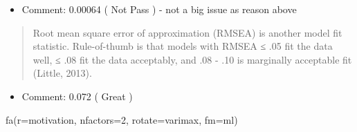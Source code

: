 \documentclass[
]{article}
\newenvironment{Shaded}{\begin{snugshade}}{\end{snugshade}}
\newcommand{\AttributeTok}[1]{\textcolor[rgb]{0.77,0.63,0.00}{#1}}
\newcommand{\DecValTok}[1]{\textcolor[rgb]{0.00,0.00,0.81}{#1}}
\newcommand{\FunctionTok}[1]{\textcolor[rgb]{0.00,0.00,0.00}{#1}}
\newcommand{\NormalTok}[1]{#1}
\newcommand{\StringTok}[1]{\textcolor[rgb]{0.31,0.60,0.02}{#1}}
\providecommand{\tightlist}{%
  \setlength{\itemsep}{0pt}\setlength{\parskip}{0pt}}
\begin{document}
\begin{itemize}
\tightlist
\item
  Comment: 0.00064 ( Not Pass ) - not a big issue as reason above
\end{itemize}

\begin{quote}
Root mean square error of approximation (RMSEA) is another model fit
statistic. Rule-of-thumb is that models with RMSEA ≤ .05 fit the data
well, ≤ .08 fit the data acceptably, and .08 - .10 is marginally
acceptable fit (Little, 2013).
\end{quote}

\begin{itemize}
\tightlist
\item
  Comment: 0.072 ( Great )
\end{itemize}

\begin{Shaded}
\begin{Highlighting}[]
\FunctionTok{fa}\NormalTok{(}\AttributeTok{r=}\NormalTok{motivation, }\AttributeTok{nfactors=}\DecValTok{2}\NormalTok{, }\AttributeTok{rotate=}\StringTok{\textquotesingle{}varimax\textquotesingle{}}\NormalTok{, }\AttributeTok{fm=}\StringTok{\textquotesingle{}ml\textquotesingle{}}\NormalTok{)}
\end{Highlighting}
\end{Shaded}
\end{document}
